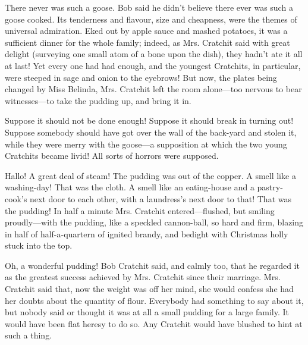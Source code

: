 \documentclass[paper=5.5in:8.5in,BCOR=15mm,twoside,DIV=15,headinclude=off,12pt,chapterprefix=off,openany,headings=huge]{scrbook} %
\begin{document}
There never was such a goose. Bob said he didn't believe there ever was such a goose cooked. Its tenderness and flavour, size and cheapness, were the themes of universal admiration. Eked out by apple sauce and mashed potatoes, it was a sufficient dinner for the whole family; indeed, as Mrs. Cratchit said with great delight (surveying one small atom of a bone upon the dish), they hadn't ate it all at last! Yet every one had had enough, and the youngest Cratchits, in particular, were steeped in sage and onion to the eyebrows! But now, the plates being changed by Miss Belinda, Mrs. Cratchit left the room alone—too nervous to bear witnesses—to take the pudding up, and bring it in.

Suppose it should not be done enough! Suppose it should break in turning out! Suppose somebody should have got over the wall of the back-yard and stolen it, while they were merry with the goose—a supposition at which the two young Cratchits became livid! All sorts of horrors were supposed.

Hallo! A great deal of steam! The pudding was out of the copper. A smell like a washing-day! That was the cloth. A smell like an eating-house and a pastry-cook's next door to each other, with a laundress's next door to that! That was the pudding! In half a minute Mrs. Cratchit entered—flushed, but smiling proudly—with the pudding, like a speckled cannon-ball, so hard and firm, blazing in half of half-a-quartern of ignited brandy, and bedight with Christmas holly stuck into the top.

Oh, a wonderful pudding! Bob Cratchit said, and calmly too, that he regarded it as the greatest success achieved by Mrs. Cratchit since their marriage. Mrs. Cratchit said that, now the weight was off her mind, she would confess she had her doubts about the quantity of flour. Everybody had something to say about it, but nobody said or thought it was at all a small pudding for a large family. It would have been flat heresy to do so. Any Cratchit would have blushed to hint at such a thing.
\end{document}
